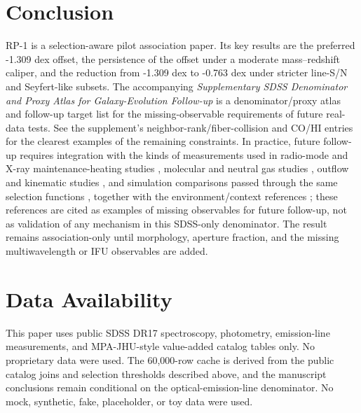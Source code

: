 \documentclass[twocolumn]{aastex631}
\begin{document}
\section{Conclusion}
RP-1 is a selection-aware pilot association paper. Its key results are the preferred -1.309 dex offset, the persistence of the offset under a moderate mass--redshift caliper, and the reduction from -1.309 dex to -0.763 dex under stricter line-S/N and Seyfert-like subsets. The accompanying \emph{Supplementary SDSS Denominator and Proxy Atlas for Galaxy-Evolution Follow-up} is a denominator/proxy atlas and follow-up target list for the missing-observable requirements of future real-data tests. See the supplement's neighbor-rank/fiber-collision and CO/HI entries for the clearest examples of the remaining constraints.
In practice, future follow-up requires integration with the kinds of measurements used in radio-mode and X-ray maintenance-heating studies \citep{best2005,fabian2012,mcnamara2007,heckmanbest2014,lamassa2013}, molecular and neutral gas studies \citep{xcoldgass2017,xgass2018}, outflow and kinematic studies \citep{veilleux2005,cicone2014,carniani2017,fiore2017}, and simulation comparisons passed through the same selection functions \citep{simba2019,tng2019,eagle2015}, together with the environment/context references \citep{peng2010,ellison2011,piotrowska2022,wetzel2013,dekel2006}; these references are cited as examples of missing observables for future follow-up, not as validation of any mechanism in this SDSS-only denominator. The result remains association-only until morphology, aperture fraction, and the missing multiwavelength or IFU observables are added.

\section*{Data Availability}
This paper uses public SDSS DR17 spectroscopy, photometry, emission-line measurements, and MPA-JHU-style value-added catalog tables only. No proprietary data were used. The 60,000-row cache is derived from the public catalog joins and selection thresholds described above, and the manuscript conclusions remain conditional on the optical-emission-line denominator.
No mock, synthetic, fake, placeholder, or toy data were used.

\end{document}
